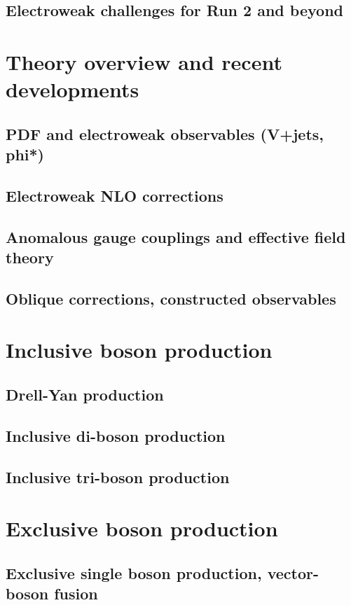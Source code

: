 \documentclass[12pt]{iopart}
\begin{document}
\subsection{Electroweak challenges for Run 2 and beyond}

\section{Theory overview and recent developments}
\subsection{PDF and electroweak observables (V+jets, phi*)}
\subsection{Electroweak NLO corrections}
\subsection{Anomalous gauge couplings and effective field theory}
\subsection{Oblique corrections, constructed observables}


\section{Inclusive boson production}
\subsection{Drell-Yan production}
\subsection{Inclusive di-boson production}
\subsection{Inclusive tri-boson production}

\section{Exclusive boson production}
\subsection{Exclusive single boson production, vector-boson fusion}
\end{document}

